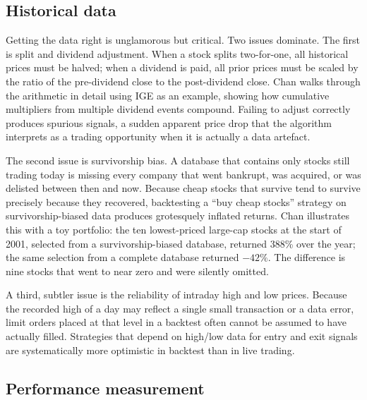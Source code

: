 \documentclass[12pt, a4paper]{article}
\begin{document}
\subsection*{Historical data}

Getting the data right is unglamorous but critical. Two issues dominate. The first is split and dividend adjustment. When a stock splits two-for-one, all historical prices must be halved; when a dividend is paid, all prior prices must be scaled by the ratio of the pre-dividend close to the post-dividend close. Chan walks through the arithmetic in detail using IGE as an example, showing how cumulative multipliers from multiple dividend events compound. Failing to adjust correctly produces spurious signals, a sudden apparent price drop that the algorithm interprets as a trading opportunity when it is actually a data artefact.

The second issue is survivorship bias. A database that contains only stocks still trading today is missing every company that went bankrupt, was acquired, or was delisted between then and now. Because cheap stocks that survive tend to survive precisely because they recovered, backtesting a ``buy cheap stocks'' strategy on survivorship-biased data produces grotesquely inflated returns. Chan illustrates this with a toy portfolio: the ten lowest-priced large-cap stocks at the start of 2001, selected from a survivorship-biased database, returned 388\% over the year; the same selection from a complete database returned $-42\%$. The difference is nine stocks that went to near zero and were silently omitted.

A third, subtler issue is the reliability of intraday high and low prices. Because the recorded high of a day may reflect a single small transaction or a data error, limit orders placed at that level in a backtest often cannot be assumed to have actually filled. Strategies that depend on high/low data for entry and exit signals are systematically more optimistic in backtest than in live trading.

\subsection*{Performance measurement}
\end{document}
